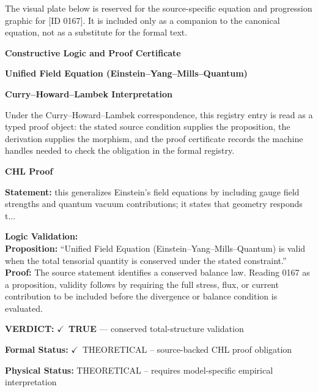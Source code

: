 \begingroup\footnotesize\sloppy
The visual plate below is reserved for the source-specific equation and progression graphic for [ID 0167]. It is included only as a companion to the canonical equation, not as a substitute for the formal text.
\par\endgroup
\ifTZPDarkEdition
{}
\fi

\clearpage
\begingroup\tzpsupportsetup
\noindent\textbf{\fontsize{10.8pt}{12.8pt}\selectfont [ID 0167] Constructive Logic and Proof Certificate}\par
\noindent\textbf{\fontsize{10pt}{12pt}\selectfont Unified Field Equation (Einstein--Yang--Mills--Quantum)}\par
\vspace{0.45em}
\begingroup
\footnotesize
\setlength{\parskip}{0.22em}
\setlength{\parindent}{0pt}
\noindent\textbf{Curry--Howard--Lambek Interpretation}\par
Under the Curry--Howard--Lambek correspondence, this registry entry is read as a typed proof
object: the stated source condition supplies the proposition, the derivation supplies the
morphism, and the proof certificate records the machine handles needed to check the obligation
in the formal registry.

\vspace{0.45em}
\noindent\textbf{CHL Proof}\par
\textbf{Statement:} this generalizes Einstein's field equations by including gauge field strengths and
quantum vacuum contributions; it states that geometry responds t...

\textbf{Logic Validation:}\\
\textbf{Proposition:} ``Unified Field Equation (Einstein--Yang--Mills--Quantum) is valid when the total
tensorial quantity is conserved under the stated constraint.''\\
\textbf{Proof:} The source statement identifies a conserved balance law. Reading 0167 as a proposition,
validity follows by requiring the full stress, flux, or current contribution to be
included before the divergence or balance condition is evaluated.

\textbf{VERDICT:} \ensuremath{\checkmark}\ \textbf{TRUE} --- conserved total-structure validation

\textbf{Formal Status:} \ensuremath{\checkmark}\ THEORETICAL -- source-backed CHL proof obligation

\textbf{Physical Status:} THEORETICAL -- requires model-specific empirical interpretation
\par\vspace{0.45em}
\par
\ifTZPDarkEdition
{}
\fi
\endgroup
\endgroup
